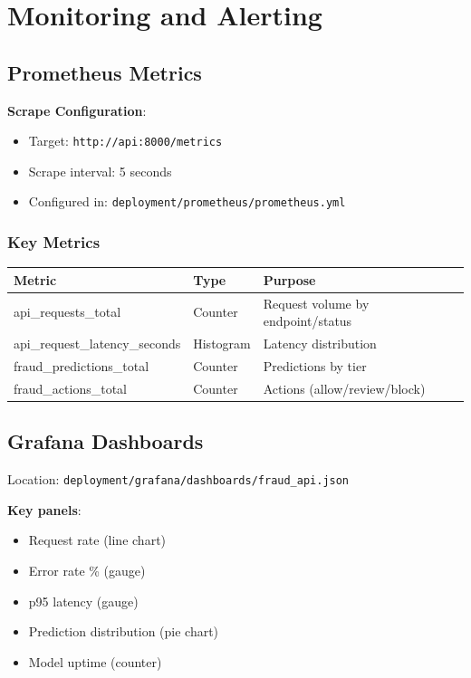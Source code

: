 \documentclass[12pt,a4paper]{article}
\newcommand{\code}[1]{\texttt{#1}}
\begin{document}
\section{Monitoring and Alerting}

\subsection{Prometheus Metrics}

\textbf{Scrape Configuration}:
\begin{itemize}
    \item Target: \code{http://api:8000/metrics}
    \item Scrape interval: 5 seconds
    \item Configured in: \code{deployment/prometheus/prometheus.yml}
\end{itemize}

\subsubsection{Key Metrics}

\begin{table}[H]
\centering
\small
\begin{tabular}{|l|l|l|}
\hline
\textbf{Metric} & \textbf{Type} & \textbf{Purpose} \\
\hline
api\_requests\_total & Counter & Request volume by endpoint/status \\
api\_request\_latency\_seconds & Histogram & Latency distribution \\
fraud\_predictions\_total & Counter & Predictions by tier \\
fraud\_actions\_total & Counter & Actions (allow/review/block) \\
\hline
\end{tabular}
\end{table}

\subsection{Grafana Dashboards}

Location: \code{deployment/grafana/dashboards/fraud\_api.json}

\textbf{Key panels}:
\begin{itemize}
    \item Request rate (line chart)
    \item Error rate \% (gauge)
    \item p95 latency (gauge)
    \item Prediction distribution (pie chart)
    \item Model uptime (counter)
\end{itemize}
\end{document}
